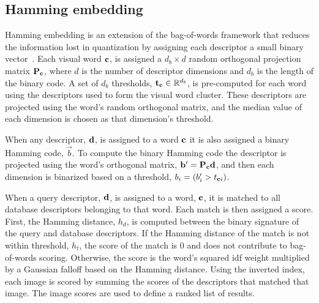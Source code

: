     \subsection{Hamming embedding}
        Hamming embedding is an extension of the bag-of-words framework that reduces the information lost in
        quantization by assigning each descriptor a small binary vector~\cite{jegou_hamming_2008,
        jegou_burstiness_2009, jegou_improving_2010}. Each visual word $\mathbf{c}$, is assigned a $d_b \times d$ random
        orthogonal projection matrix $\mathbf{P}_{\mathbf{c}}$, where $d$ is the number of descriptor dimensions and $d_b$ is
        the length of the binary code. A set of $d_b$ thresholds, $\mathbf{t}_{\mathbf{c}} \in \mathbb{R}^{d_b}$, is pre-computed for
        each word using the descriptors used to form the visual word cluster. These descriptors are projected using
        the word's random orthogonal matrix, and the median value of each dimension is chosen as that dimension's
        threshold.

        When any descriptor, $\mathbf{d}$, is assigned to a word $\mathbf{c}$ it is also assigned a binary Hamming code,
        $\vec{b}$. To compute the binary Hamming code the descriptor is projected using the word's orthogonal
        matrix, $\mathbf{b}' = \mathbf{P}_{\mathbf{c}} \mathbf{d}$, and then each dimension is binarized based on a threshold, %
        $b_i = (b'_i > t_{\mathbf{c}{}i})$.

        When a query descriptor, $\mathbf{d}$, is assigned to a word, $\mathbf{c}$, it is matched to all database descriptors
        belonging to that word. Each match is then assigned a score. First, the Hamming distance, $h_d$, is
        computed between the binary signature of the query and database descriptors. If the Hamming distance of the
        match is not within threshold, $h_t$, the score of the match is $0$ and does not contribute to bag-of-words
        scoring. Otherwise, the score is the word's squared idf weight multiplied by a Gaussian falloff based on
        the Hamming distance. Using the inverted index, each image is scored by summing the scores of the
        descriptors that matched that image. The image scores are used to define a ranked list of results.

